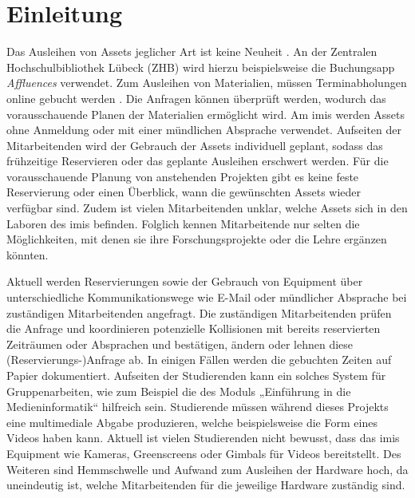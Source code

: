 
\chapter{Einleitung}

Das Ausleihen von Assets jeglicher Art ist keine Neuheit \cite{soderholm2018borrowing}. An der
Zentralen Hochschulbibliothek Lübeck (ZHB) wird hierzu beispielsweise die Buchungsapp
\textit{Affluences} verwendet. Zum Ausleihen von Materialien, müssen Terminabholungen online gebucht
werden \cite{zhb_offnung_nodate}. Die Anfragen können überprüft werden, wodurch das vorausschauende Planen
der Materialien ermöglicht wird. Am \ac{imis} werden Assets ohne Anmeldung oder mit einer mündlichen
Absprache verwendet. Aufseiten der Mitarbeitenden wird der Gebrauch der Assets individuell geplant,
sodass das frühzeitige Reservieren oder das geplante Ausleihen erschwert werden. Für die
vorausschauende Planung von anstehenden Projekten gibt es keine feste Reservierung oder einen
Überblick, wann die gewünschten Assets wieder verfügbar sind. Zudem ist vielen Mitarbeitenden
unklar, welche Assets sich in den Laboren des \ac{imis} befinden. Folglich kennen Mitarbeitende nur
selten die Möglichkeiten, mit denen sie ihre Forschungsprojekte oder die Lehre ergänzen könnten.

Aktuell werden Reservierungen sowie der Gebrauch von Equipment über unterschiedliche
Kommunikationswege wie E-Mail oder mündlicher Absprache bei zuständigen Mitarbeitenden angefragt. Die
zuständigen Mitarbeitenden prüfen die Anfrage und koordinieren potenzielle Kollisionen mit bereits
reservierten Zeiträumen oder Absprachen und bestätigen, ändern oder lehnen diese
(Reservierungs-)Anfrage ab. In einigen Fällen werden die gebuchten Zeiten auf Papier dokumentiert.
Aufseiten der Studierenden kann ein solches System für Gruppenarbeiten, wie zum Beispiel die des Moduls
„Einführung in die Medieninformatik“ hilfreich sein. Studierende müssen während dieses Projekts eine
multimediale Abgabe produzieren, welche beispielsweise die Form eines Videos haben kann. Aktuell ist
vielen Studierenden nicht bewusst, dass das \ac{imis} Equipment wie Kameras, Greenscreens oder Gimbals für
Videos bereitstellt. Des Weiteren sind Hemmschwelle und Aufwand zum Ausleihen der Hardware hoch, da
uneindeutig ist, welche Mitarbeitenden für die jeweilige Hardware zuständig sind.


